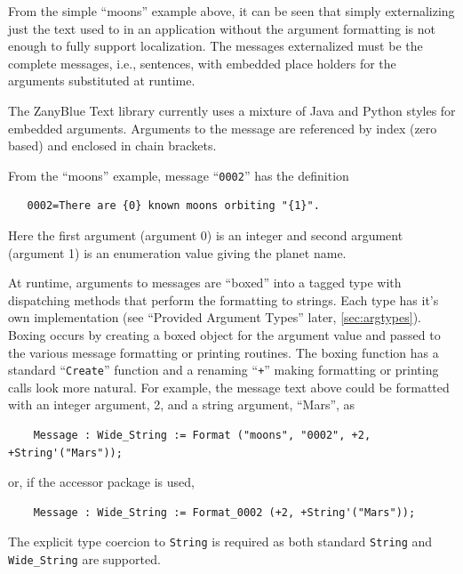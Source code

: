 From the simple ``moons'' example above, it can be seen that simply
externalizing just the text used to in an application without the argument
formatting is not enough to fully support localization.  The messages
externalized must be the complete messages, i.e., sentences, with embedded
place holders for the arguments substituted at runtime.

The ZanyBlue Text library currently uses a mixture of Java and Python styles
for embedded arguments.  Arguments to the message are referenced by index
(zero based) and enclosed in chain brackets.

From the ``moons'' example, message ``\texttt{0002}'' has the definition
\begin{xmpl}
\begin{verbatim}
   0002=There are {0} known moons orbiting "{1}".
\end{verbatim}
\end{xmpl}

Here the first argument (argument 0) is an integer and second argument
(argument 1) is an enumeration value giving the planet name.

At runtime, arguments to messages are ``boxed'' into a tagged type with
dispatching methods that perform the formatting to strings.  Each type has
it's own implementation (see ``Provided Argument Types'' later,
\ref{sec:argtypes}).  Boxing occurs by creating a boxed object for the
argument value and passed to the various message formatting or printing
routines.  The boxing function has a standard ``\texttt{Create}'' function
and a renaming ``\texttt{+}'' making formatting or printing calls look more
natural.  For example, the message text above could be formatted with an
integer argument, 2, and a string argument, ``Mars'', as
\begin{xmpl}
\begin{verbatim}
    Message : Wide_String := Format ("moons", "0002", +2, +String'("Mars"));
\end{verbatim}
\end{xmpl}
or, if the accessor package is used,
\begin{xmpl}
\begin{verbatim}
    Message : Wide_String := Format_0002 (+2, +String'("Mars"));
\end{verbatim}
\end{xmpl}
The explicit type coercion to \texttt{String} is required as both standard
\texttt{String} and \texttt{Wide\_String} are supported.

